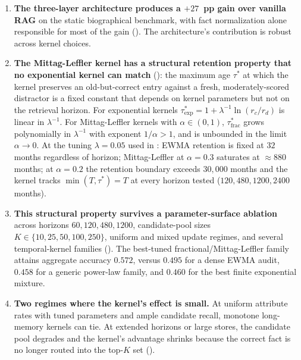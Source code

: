 \documentclass[11pt]{article}
\theoremstyle{plain}
\theoremstyle{definition}
\begin{document}
\begin{enumerate}[label=\textbf{(\arabic*)}]
\item \textbf{The three-layer architecture produces a
  $+27$~pp gain over vanilla RAG} on the static
  biographical benchmark, with fact normalization
  alone responsible for most of the gain
  ().  The architecture's contribution
  is robust across kernel choices.

\item \textbf{The Mittag-Leffler kernel has a
  structural retention property that no exponential
  kernel can match} (): the
  maximum age $\tau^*$ at which the kernel
  preserves an old-but-correct entry against a fresh,
  moderately-scored distractor is a fixed constant
  that depends on kernel parameters but not on the
  retrieval horizon.  For exponential kernels
  $\tau^*_{\mathrm{exp}} = 1 + \lambda^{-1}
  \ln(r_c/r_d)$ is linear in $\lambda^{-1}$.  For
  Mittag-Leffler kernels with $\alpha \in (0, 1)$,
  $\tau^*_{\mathrm{frac}}$ grows polynomially in
  $\lambda^{-1}$ with exponent $1/\alpha > 1$, and
  is unbounded in the limit $\alpha \to 0$.  At the
  tuning $\lambda = 0.05$ used in
  : EWMA retention is fixed at
  $32$ months regardless of horizon;
  Mittag-Leffler at $\alpha = 0.3$ saturates at
  $\approx 880$ months; at $\alpha = 0.2$ the
  retention boundary exceeds $30{,}000$ months and
  the kernel tracks $\min(T, \tau^*) = T$ at every
  horizon tested ($120, 480, 1200, 2400$ months).


\item \textbf{This structural property survives a
  parameter-surface ablation} across horizons
  $60,120,480,1200$, candidate-pool sizes
  $K\in\{10,25,50,100,250\}$, uniform and mixed update
  regimes, and several temporal-kernel families
  ().  The best-tuned
  fractional/Mittag-Leffler family attains aggregate
  accuracy $0.572$, versus $0.495$ for a dense EWMA
  audit, $0.458$ for a generic power-law family, and
  $0.460$ for the best finite exponential mixture.

\item \textbf{Two regimes where the kernel's effect
  is small.}  At uniform attribute rates with tuned
  parameters and ample candidate recall, monotone
  long-memory kernels can tie.  At extended horizons
  or large stores, the candidate pool degrades and
  the kernel's advantage shrinks because the correct
  fact is no longer routed into the top-$K$ set
  ().


\end{enumerate}
\end{document}
